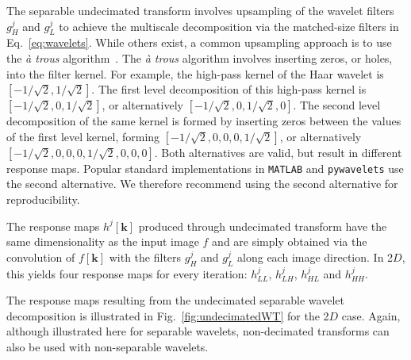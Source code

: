 \documentclass[fleqn,a4paper,oneside,openany]{book}
\begin{document}
The separable undecimated transform involves upsampling of the wavelet filters $g_H^j$ and $g_L^j$ to achieve the multiscale decomposition via the matched-size filters in Eq.~\eqref{eq:wavelets}.
While others exist, a common upsampling approach is to use the \emph{\`{a} trous} algorithm~\cite{Dut1989}.
%
The \emph{\`{a} trous} algorithm involves inserting zeros, or holes, into the filter kernel. For example, the high-pass kernel of the Haar wavelet is \(\left[ -1 / \sqrt{2}, 1 / \sqrt{2}\right]\). The first level decomposition of this high-pass kernel is \(\left[ -1 / \sqrt{2}, 0, 1 / \sqrt{2}\right]\), or alternatively \(\left[ -1 / \sqrt{2}, 0, 1 / \sqrt{2}, 0\right]\). The second level decomposition of the same kernel is formed by inserting zeros between the values of the first level kernel, forming \(\left[ -1 / \sqrt{2}, 0, 0, 0, 1 / \sqrt{2}\right]\), or alternatively \(\left[ -1 / \sqrt{2}, 0, 0, 0, 1 / \sqrt{2}, 0, 0, 0\right]\). Both alternatives are valid, but result in different response maps. Popular standard implementations in \texttt{MATLAB} and \texttt{pywavelets} use the second alternative. We therefore recommend using the second alternative for reproducibility.

The response maps $h^j[\boldsymbol{k}]$ produced through undecimated transform have the same dimensionality as the input image $f$ and are simply obtained via the convolution of $f[\boldsymbol{k}]$ with the filters $g_H^j$ and $g_L^j$ along each image direction.
In 2$D$, this yields four response maps for every iteration: $h_{LL}^j$, $h_{LH}^j$, $h_{HL}^j$ and $h_{HH}^j$.

The response maps resulting from the undecimated separable wavelet decomposition is illustrated in Fig.~\ref{fig:undecimatedWT} for the 2$D$ case.
Again, although illustrated here for separable wavelets, non-decimated transforms can also be used with non-separable wavelets.
%
\end{document}

